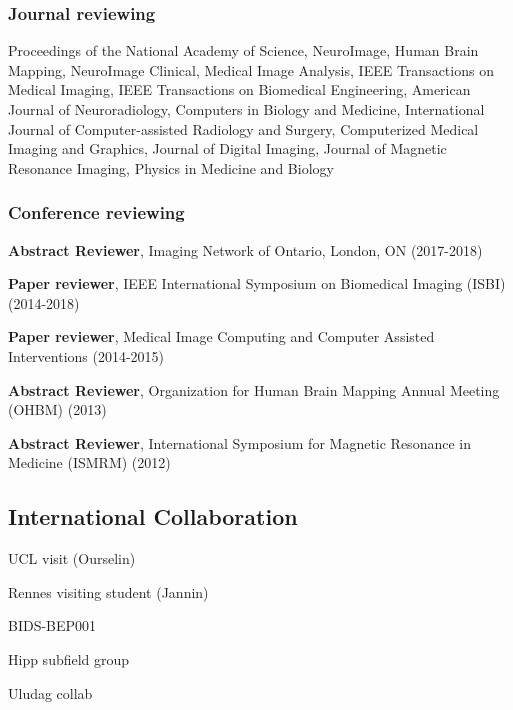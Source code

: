 \subsubsection*{Journal reviewing}
\begin{packed_item}

\item  Proceedings of the National Academy of Science,
NeuroImage,
Human Brain Mapping,
NeuroImage Clinical,
Medical Image Analysis,
IEEE Transactions on Medical Imaging,
IEEE Transactions on Biomedical Engineering,
American Journal of Neuroradiology,
Computers in Biology and Medicine,
International Journal of Computer-assisted Radiology and Surgery,
Computerized Medical Imaging and Graphics,
Journal of Digital Imaging,
Journal of Magnetic Resonance Imaging,
Physics in Medicine and Biology

\end{packed_item}

\subsubsection*{Conference reviewing}
\begin{packed_item}

\item \textbf{ Abstract Reviewer}, Imaging Network of Ontario, London, ON (2017-2018)
\item \textbf{ Paper reviewer}, IEEE International Symposium on Biomedical Imaging (ISBI)  (2014-2018)
\item \textbf{ Paper reviewer}, Medical Image Computing and Computer Assisted Interventions  (2014-2015)
\item \textbf{ Abstract Reviewer}, Organization for Human Brain Mapping Annual Meeting (OHBM) (2013)
\item \textbf{ Abstract Reviewer}, International Symposium for Magnetic Resonance in Medicine (ISMRM) (2012)
\end{packed_item}

\subsection{International Collaboration}

\begin{packed_item}
\item UCL visit (Ourselin)
\item Rennes visiting student (Jannin)
\item BIDS-BEP001
\item Hipp subfield group
\item Uludag collab 
\end{packed_item}

